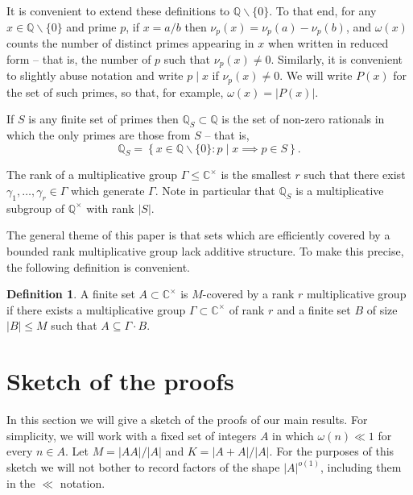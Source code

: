 \documentclass{amsart}
\renewcommand{\leq}{\leqslant}
\newcommand{\bbq}{\mathbb{Q}}
\newcommand{\bbc}{\mathbb{C}}
\newcommand{\abs}[1]{\left\lvert #1\right\rvert}
\theoremstyle{definition}
\newtheorem{definition}{Definition}
\begin{document}
It is convenient to extend these definitions to $\bbq\backslash\{0\}$. To that end, for any $x\in \bbq\backslash\{0\}$ and prime $p$, if $x=a/b$ then $\nu_p(x)=\nu_p(a)-\nu_p(b)$, and $\omega(x)$ counts the number of distinct primes appearing in $x$ when written in reduced form -- that is, the number of $p$ such that $\nu_p(x)\neq 0$. Similarly, it is convenient to slightly abuse notation and write $p\mid x$ if $\nu_p(x)\neq 0$. We will write $P(x)$ for the set of such primes, so that, for example, $\omega(x)=\abs{P(x)}$. 

If $S$ is any finite set of primes then $\bbq_S\subset \bbq$ is the set of non-zero rationals in which the only primes are those from $S$ -- that is,
\[\bbq_S = \left\{x\in \bbq\backslash\{0\} : p\mid x\implies p\in S\right\}.\]

The rank of a multiplicative group $\Gamma\leq \bbc^\times$ is the smallest $r$ such that there exist $\gamma_1,\ldots,\gamma_r\in \Gamma$ which generate $\Gamma$. Note in particular that $\bbq_S$ is a multiplicative subgroup of $\bbq^\times$ with rank $\abs{S}$.

The general theme of this paper is that sets which are efficiently covered by a bounded rank multiplicative group lack additive structure. To make this precise, the following definition is convenient.

\begin{definition}
A finite set $A\subset \bbc^\times$ is $M$-covered by a rank $r$ multiplicative group if there exists a multiplicative group $\Gamma\subset \bbc^\times$ of rank $r$ and a finite set $B$ of size $\abs{B}\leq M$ such that $A\subseteq \Gamma \cdot B$.
\end{definition}

\section{Sketch of the proofs}\label{sec-sketch}

In this section we will give a sketch of the proofs of our main results. For simplicity, we will work with a fixed set of integers $A$ in which $\omega(n) \ll 1$ for every $n\in A$. Let $M=\abs{AA}/\abs{A}$ and $K=\abs{A+A}/\abs{A}$. For the purposes of this sketch we will not bother to record factors of the shape $\abs{A}^{o(1)}$, including them in the $\ll$ notation.
\end{document}
